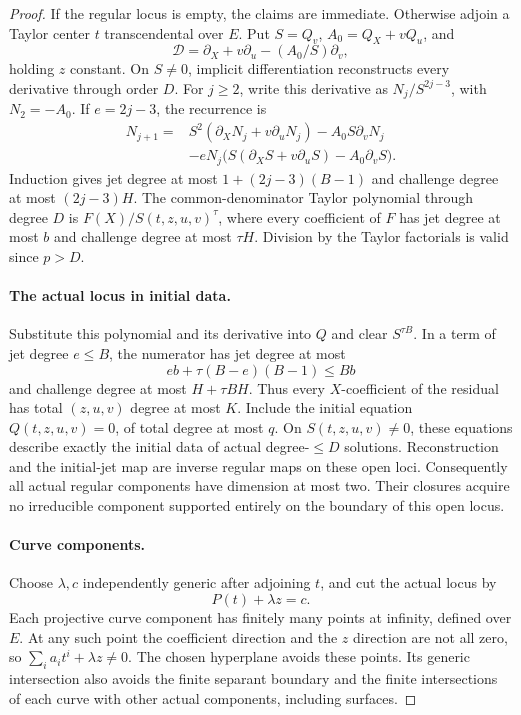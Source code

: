 \begin{proof}
If the regular locus is empty, the claims are immediate. Otherwise
adjoin a Taylor center $t$ transcendental over $E$. Put
$S=Q_v$, $A_0=Q_X+vQ_u$, and
\[
 \mathcal D=\partial_X+v\partial_u-(A_0/S)\partial_v,
\]
holding $z$ constant. On $S\ne0$, implicit differentiation reconstructs
every derivative through order $D$. For $j\ge2$, write this derivative
as $N_j/S^{2j-3}$, with $N_2=-A_0$. If $e=2j-3$, the recurrence is
\[
\begin{split}
 N_{j+1}={}&S^2(\partial_XN_j+v\partial_uN_j)
       -A_0S\partial_vN_j\\
 &-eN_j\bigl(S(\partial_XS+v\partial_uS)-A_0\partial_vS\bigr).
\end{split}
\]
Induction gives jet degree at most $1+(2j-3)(B-1)$ and challenge
degree at most $(2j-3)H$. The common-denominator Taylor polynomial
through degree $D$ is $F(X)/S(t,z,u,v)^\tau$, where every coefficient
of $F$ has jet degree at most $b$ and challenge degree at most $\tau H$.
Division by the Taylor factorials is valid since $p>D$.

\paragraph{The actual locus in initial data.}
Substitute this polynomial and its derivative into $Q$ and clear
$S^{\tau B}$. In a term of jet degree $e\le B$, the numerator has
jet degree at most
\[
 e b+\tau(B-e)(B-1)\le B b
\]
and challenge degree at most $H+\tau BH$. Thus every $X$-coefficient
of the residual has total $(z,u,v)$ degree at most $K$.
Include the initial equation $Q(t,z,u,v)=0$, of total degree at most $q$.
On $S(t,z,u,v)\ne0$, these equations describe exactly the initial
data of actual degree-$\le D$ solutions. Reconstruction and the
initial-jet map are inverse regular maps on these open loci.
Consequently all actual regular components have dimension at most two.
Their closures acquire no irreducible component supported entirely
on the boundary of this open locus.

\paragraph{Curve components.}
Choose $\lambda,c$ independently generic after adjoining $t$, and
cut the actual locus by
\[
 P(t)+\lambda z=c.
\]
Each projective curve component has finitely many points at infinity,
defined over $E$. At any such point the coefficient direction and
the $z$ direction are not all zero, so
$\sum_i a_i t^i+\lambda z\ne0$. The chosen hyperplane avoids these
points. Its generic intersection also avoids the finite separant
boundary and the finite intersections of each curve with other
actual components, including surfaces.


\end{proof}
